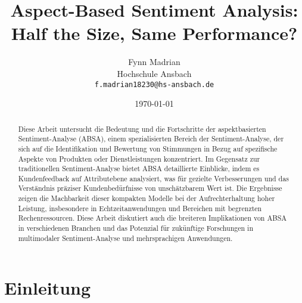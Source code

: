 \documentclass[12pt]{article}
\title{Aspect-Based Sentiment Analysis: Half the Size, Same Performance?}
\author{Fynn Madrian \\ Hochschule Ansbach \\ \texttt{f.madrian18230@hs-ansbach.de}}
\date{\today}
\begin{document}
\maketitle

\begin{abstract}
Diese Arbeit untersucht die Bedeutung und die Fortschritte der aspektbasierten Sentiment-Analyse (ABSA), einem spezialisierten Bereich der 
Sentiment-Analyse, der sich auf die Identifikation und Bewertung von Stimmungen in Bezug auf spezifische Aspekte von Produkten oder Dienstleistungen 
konzentriert. Im Gegensatz zur traditionellen Sentiment-Analyse bietet ABSA detaillierte Einblicke, indem es Kundenfeedback auf Attributebene 
analysiert, was für gezielte Verbesserungen und das Verständnis präziser Kundenbedürfnisse von unschätzbarem Wert ist. 
Die Ergebnisse zeigen die Machbarkeit dieser kompakten Modelle bei der Aufrechterhaltung hoher Leistung, insbesondere 
in Echtzeitanwendungen und Bereichen mit begrenzten Rechenressourcen. Diese Arbeit diskutiert auch die breiteren Implikationen 
von ABSA in verschiedenen Branchen und das Potenzial für zukünftige Forschungen in multimodaler Sentiment-Analyse und mehrsprachigen 
Anwendungen.
\end{abstract}

\newpage

\tableofcontents
\setcounter{tocdepth}{4}

\newpage 

\section{Einleitung}
\end{document}
